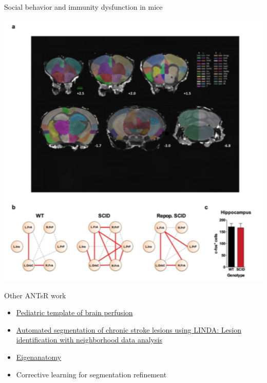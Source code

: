 \documentclass[ignorenonframetext,]{beamer}
\begin{document}
\begin{frame}{Social behavior and immunity dysfunction in mice}

\includegraphics{./antsr/figures/filiano_rsfmri.png}

\end{frame}

\begin{frame}{Other ANTsR work}

\begin{itemize}
\item
  \href{http://www.nature.com/articles/sdata20153}{Pediatric template of
  brain perfusion}
\item
  \href{http://www.ncbi.nlm.nih.gov/pubmed/26756101}{Automated
  segmentation of chronic stroke lesions using LINDA: Lesion
  identification with neighborhood data analysis}
\item
  \href{http://www.ncbi.nlm.nih.gov/pubmed/25448483}{Eigenanatomy}
\item
  Corrective learning for segmentation refinement
\end{itemize}

\hypertarget{refs}{}

\end{frame}
\end{document}
